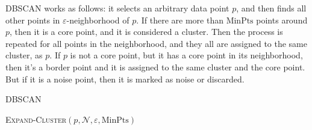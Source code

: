 DBSCAN works as follows: it selects an arbitrary data point $p$, and then
finds all other points in $\varepsilon$-neighborhood of $p$. If
there are more than $\text{MinPts}$ points around $p$, then it is a core point,
and it is considered a cluster. Then the process is repeated for all points in
the neighborhood, and they all are assigned to the same cluster, as $p$.
If $p$ is not a core point, but it has a core point in its neighborhood, then
it's a border point and it is assigned to the same cluster and the core point.
But if it is a noise point, then it is marked as noise or discarded.


\begin{algorithm}
\caption{DBSCAN}
\label{algo:dbscan}

\begin{algorithmic}[0]
  \Statex

      \EndIf
      \Else
            {\textsc{Expand-Cluster}$(p, \mathcal N, \varepsilon, \text{MinPts})$}
      \EndIf
    \EndFor
    \State {}
  \EndFunction
\end{algorithmic}


\begin{algorithmic}[0]
  \Statex
        \EndIf

        \EndIf

     \EndFor

     \State {}
  \EndFunction
\end{algorithmic}

\begin{algorithmic}[0]
  \Statex
     \State {} 
  \EndFunction
\end{algorithmic}

\end{algorithm}


